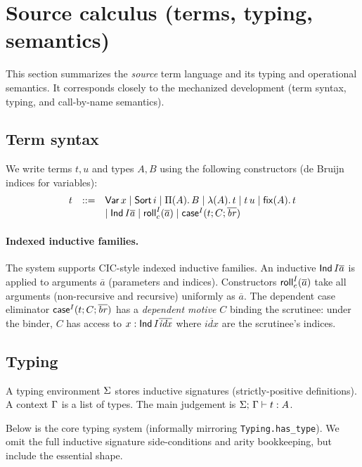 \section{Source calculus (terms, typing, semantics)}
\label{sec:source}

This section summarizes the \emph{source} term language and its typing and operational semantics.
It corresponds closely to the mechanized development (term syntax, typing, and call-by-name semantics).
\subsection{Term syntax}

We write terms \(t,u\) and types \(A,B\) using the following constructors (de Bruijn indices for variables):
\[
\begin{array}{rcl}
 t &::=& \mathsf{Var}\,x
 \mid \mathsf{Sort}\,i
 \mid \Pi(A).\,B
 \mid \lambda(A).\,t
 \mid t\,u
 \mid \mathsf{fix}(A).\,t
 \\
 &&\mid \mathsf{Ind}\,I{\overline{a}}
 \mid \mathsf{roll}^{I}_{c}(\overline{a})
 \mid \mathsf{case}^{I}(t;C;\overline{\mathit{br}})
\end{array}
\]

\paragraph{Indexed inductive families.}
The system supports CIC-style indexed inductive families.
An inductive \(\mathsf{Ind}\,I{\overline{a}}\) is applied to arguments \(\overline{a}\) (parameters and indices).
Constructors \(\mathsf{roll}^{I}_{c}(\overline{a})\) take all arguments (non-recursive and recursive) uniformly as \(\overline{a}\).
The dependent case eliminator \(\mathsf{case}^{I}(t;C;\overline{\mathit{br}})\) has a \emph{dependent motive} \(C\) binding the scrutinee: under the binder, \(C\) has access to \(x : \mathsf{Ind}\,I{\overline{\mathit{idx}}}\) where \(\overline{\mathit{idx}}\) are the scrutinee's indices.

\subsection{Typing}

A typing environment \(\Sigma\) stores inductive signatures (strictly-positive definitions).
A context \(\Gamma\) is a list of types.
The main judgement is \(\Sigma;\,\Gamma \vdash t : A\).

Below is the core typing system (informally mirroring \texttt{Typing.has\_type}).
We omit the full inductive signature side-conditions and arity bookkeeping, but include the essential shape.

